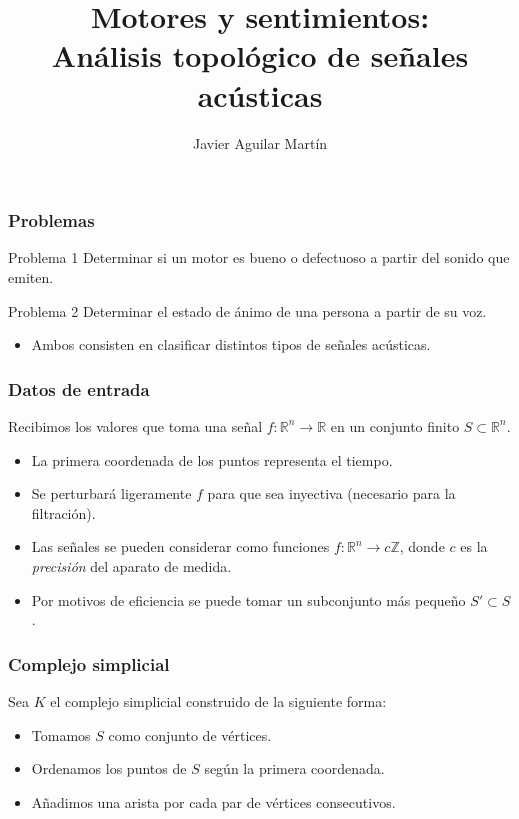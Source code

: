 \documentclass{beamer}
\title{Motores y sentimientos:\\ Análisis topológico de señales acústicas}
\author{Javier Aguilar Martín}
\institute{Universidad de Sevilla}
\newcommand{\R}{\mathbb{R}}
\newcommand{\Z}{\mathbb{Z}}
\begin{document}
\frame{\titlepage}

\begin{frame}
\frametitle{Problemas}

\begin{block}{Problema 1}
Determinar si un motor es bueno o defectuoso a partir del sonido que emiten.
\end{block}\pause

\begin{block}{Problema 2}
Determinar el estado de ánimo de una persona a partir de su voz.
\end{block}\pause
\vspace{0.5cm}

\begin{itemize}
\item Ambos consisten en clasificar distintos tipos de señales acústicas.
\end{itemize}

\end{frame}




\begin{frame}
\frametitle{Datos de entrada}
Recibimos los valores que toma una señal $f:\R^n\to\R$ en un conjunto finito $S\subset \R^n$.

\begin{itemize}
\item<2-> La primera coordenada de los puntos representa el tiempo.
\item<3-> Se perturbará ligeramente $f$ para que sea inyectiva (necesario para la filtración).
\item<4-> Las señales se pueden considerar como funciones $f:\R^n\to c\Z$, donde $c$ es la \emph{precisión} del aparato de medida.
\item<5-> Por motivos de eficiencia se puede tomar un subconjunto más pequeño $S'\subset S$.
\end{itemize}
\end{frame}



\begin{frame}
\frametitle{Complejo simplicial}

Sea $K$ el complejo simplicial construido de la siguiente forma:
\begin{itemize}
\item<2-> Tomamos $S$ como conjunto de vértices.
\item<3-> Ordenamos los puntos de $S$ según la primera coordenada.
\item<4-> Añadimos una arista por cada par de vértices consecutivos.
\end{itemize}\pause


\end{frame}
\end{document}
